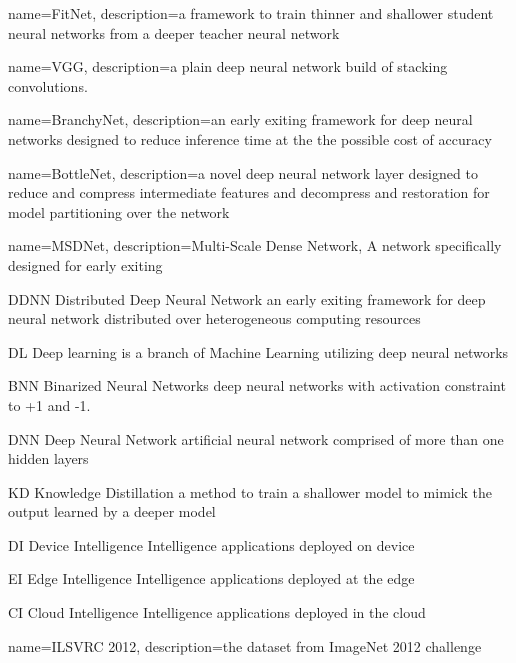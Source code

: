 {
	name={FitNet},
	description={a framework to train thinner and shallower student neural networks from a deeper teacher neural network}
}

{
	name={VGG},
	description={a plain deep neural network build of stacking convolutions.}
}


{
	name={BranchyNet},
	description={an early exiting framework for deep neural networks designed to reduce inference time at the the possible cost of accuracy}
}

{
	name={BottleNet},
	description={a novel deep neural network layer designed to reduce and compress intermediate features and decompress and restoration for model partitioning over the network}
}

{
	name={MSDNet},
	description={Multi-Scale Dense Network, A network specifically designed for early exiting}
}

	
	{DDNN}
	{Distributed Deep Neural Network}
	{an early exiting framework for deep neural network distributed over heterogeneous computing resources}
	
	{DL}
	{Deep learning}
	{is a branch of Machine Learning utilizing deep neural networks}
	
	{BNN}
	{Binarized Neural Networks}
	{deep neural networks with activation constraint to +1 and -1.}
	
	{DNN}
	{Deep Neural Network}
	{artificial neural network comprised of more than one hidden layers}
	
	{KD}
	{Knowledge Distillation}
	{a method to train a shallower model to mimick the output learned by a deeper model}
	

{DI}
{Device Intelligence}
{Intelligence applications deployed on device}

	{EI}
	{Edge Intelligence}
	{Intelligence applications deployed at the edge}
	
{CI}
{Cloud Intelligence}
{Intelligence applications deployed in the cloud}
	

{
	name={ILSVRC 2012},
	description={the dataset from ImageNet 2012 challenge}
}

